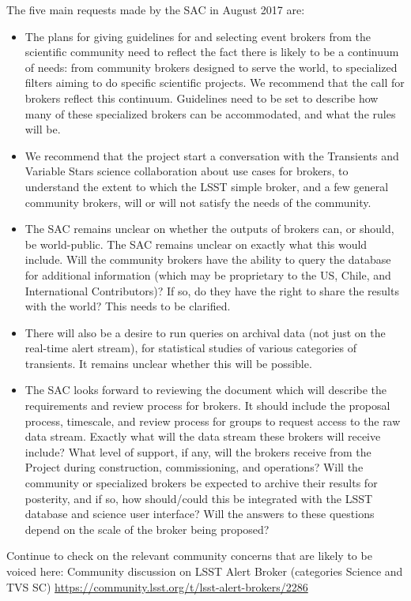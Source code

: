 {The five main requests made by the SAC in August 2017 are:
\begin{itemize}
\item The plans for giving guidelines for and selecting event brokers
  from the scientific community need to reflect the fact there is
  likely to be a continuum of needs: from community brokers designed
  to serve the world, to specialized filters aiming to do specific
  scientific projects.  We recommend that the call for brokers reflect
  this continuum. Guidelines need to be set to describe how many of these specialized
brokers can be accommodated, and what the rules will be.
\item We recommend that the project start a conversation with the
  Transients and Variable Stars science collaboration about use cases
  for brokers, to understand the extent to which the LSST simple
  broker, and a few general community brokers, will or will not
  satisfy the needs of the community. 
\item The SAC remains unclear on whether the outputs of brokers can, or should, be world-public. The SAC remains unclear on exactly what this would include. Will the community brokers have the ability to query the database for additional information (which may be proprietary to the US, Chile, and International Contributors)? If so, do they have the right to share the results with the world? This needs to be clarified.
\item There will also be a desire to run queries on archival data (not just on the real-time alert stream), for statistical studies of various categories of transients.  It remains unclear whether this will be possible.
\item The SAC looks forward to reviewing the document which will describe the requirements and review process for brokers. It should include the proposal process, timescale, and
review process for groups to request access to the raw data stream.
Exactly what will the data stream these brokers will receive include?
What level of support, if any, will the brokers receive from the
Project during construction, commissioning, and operations?  Will the
community or specialized brokers be expected to archive their results
for posterity, and if so, how should/could this be integrated with the
LSST database and science user interface?  Will the answers to these
questions depend on the scale of the broker being proposed?
\end{itemize}

Continue to check on the relevant community concerns that are likely to be voiced here:
Community discussion on LSST Alert Broker (categories Science and TVS SC)
\url{https://community.lsst.org/t/lsst-alert-brokers/2286}

}

